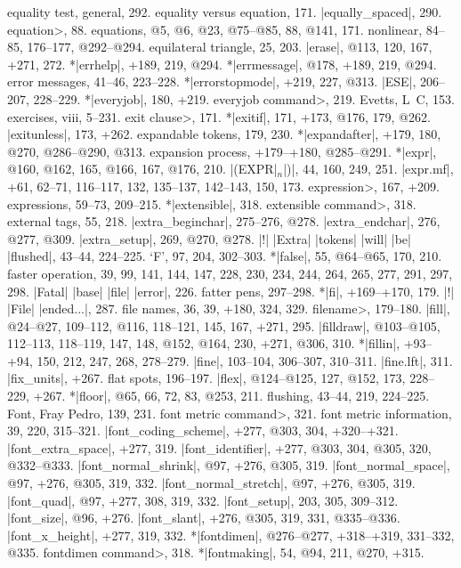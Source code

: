 equality test, general, 292.
equality versus equation, 171.
|equally_spaced|, 290.
\<equation>, 88.
equations, @5, @6, @23, @75--@85, 88, @141, 171.
\sub nonlinear, 84--85, 176--177, @292--@294.
equilateral triangle, 25, 203.
|erase|, @113, 120, 167, +271, 272.
*|errhelp|, +189, 219, @294.
*|errmessage|, @178, +189, 219, @294.
error messages, 41--46, 223--228.
*|errorstopmode|, +219, 227, @313.
|ESE|, 206--207, 228--229.
*|everyjob|, 180, +219.
\<everyjob command>, 219.
Evetts, L\period\ C\period, 153.
exercises, viii, 5--231.
\<exit clause>, 171.
*|exitif|, 171, +173, @176, 179, @262.
|exitunless|, 173, +262.
expandable tokens, 179, 230.
*|expandafter|, +179, 180, @270, @286--@290, @313.
expansion process, +179--+180, @285--@291.
*|expr|, @160, @162, 165, @166, 167, @176, 210.
|(EXPR|$_n$|)|, 44, 160, 249, 251.
|expr.mf|, +61, 62--71, 116--117, 132, 135--137, 142--143, 150, 173.
\<expression>, 167, +209.
expressions, 59--73, 209--215.
*|extensible|, 318.
\<extensible command>, 318.
external tags, 55, 218.
|extra_beginchar|, 275--276, @278.
|extra_endchar|, 276, @277, @309.
|extra_setup|, 269, @270, @278.
|!| |Extra| |tokens| |will| |be| |flushed|, 43--44, 224--225.
\newletter
`F', 97, 204, 302--303.
*|false|, 55, @64--@65, 170, 210.
faster operation, 39, 99, 141, 144, 147, 228, 230, 234, 244, 264, 265, 277,
 291, 297, 298.
|Fatal| |base| |file| |error|, 226.
fatter pens, 297--298.
*|fi|, +169--+170, 179.
|!| |File| |ended...|, 287.
file names, 36, 39, +180, 324, 329.
\<filename>, 179--180.
|fill|, @24--@27, 109--112, @116, 118--121, 145, 167, +271, 295.
|filldraw|, @103--@105, 112--113, 118--119, 147, 148, @152, @164,
 230, +271, @306, 310.
*|fillin|, +93--+94, 150, 212, 247, 268, 278--279.
|fine|, 103--104, 306--307, 310--311.
|fine.lft|, 311.
|fix_units|, +267.
flat spots, 196--197.
|flex|, @124--@125, 127, @152, 173, 228--229, +267.
*|floor|, @65, 66, 72, 83, @253, 211.
flushing, 43--44, 219, 224--225.
Font, Fray Pedro, 139, 231.
\<font metric command>, 321.
font metric information, 39, 220, 315--321.
|font_coding_scheme|, +277, @303, 304, +320--+321.
|font_extra_space|, +277, 319.
|font_identifier|, +277, @303, 304, @305, 320, @332--@333.
|font_normal_shrink|, @97, +276, @305, 319.
|font_normal_space|, @97, +276, @305, 319, 332.
|font_normal_stretch|, @97, +276, @305, 319.
|font_quad|, @97, +277, 308, 319, 332.
|font_setup|, 203, 305, 309--312.
|font_size|, @96, +276.
|font_slant|, +276, @305, 319, 331, @335--@336.
|font_x_height|, +277, 319, 332.
*|fontdimen|, @276--@277, +318--+319, 331--332, @335.
\<fontdimen command>, 318.
*|fontmaking|, 54, @94, 211, @270, +315.
